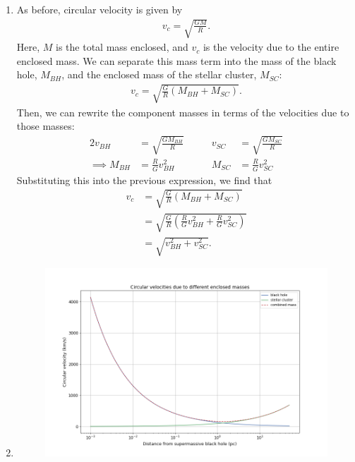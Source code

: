 \documentclass[11pt,letterpaper]{article}
\begin{document}
\begin{enumerate}[label=(\alph*)]
    \item As before, circular velocity is given by 
        \begin{align*}
            v_c = \sqrt{\frac{GM}{R}}.
        \end{align*}
        Here, $M$ is the total mass enclosed, and $v_c$ is the velocity due to the entire enclosed mass. We can separate this mass term into the mass of the black hole, $M_{BH}$, and the enclosed mass of the stellar cluster, $M_{SC}$:
        \begin{align*}
            v_c = \sqrt{\frac{G}{R}(M_{BH}+M_{SC})}.
        \end{align*}
        Then, we can rewrite the component masses in terms of the velocities due to those masses:
        \begin{alignat*}{2}
            v_{BH} &= \sqrt{\frac{GM_{BH}}{R}} &\qquad v_{SC} &= \sqrt{\frac{GM_{SC}}{R}} \\
            \implies M_{BH} &= \frac{R}{G}v_{BH}^2 &\qquad M_{SC} &= \frac{R}{G}v_{SC}^2
        \end{alignat*}
        Substituting this into the previous expression, we find that 
        \begin{align*}
            v_c &= \sqrt{\frac{G}{R}(M_{BH}+M_{SC})} \\
            &= \sqrt{\frac{G}{R}\left(\frac{R}{G}v_{BH}^2+\frac{R}{G}v_{SC}^2\right)} \\
            &= \sqrt{v_{BH}^2 + v_{SC}^2}.
        \end{align*}

    \item \hfill\vspace{-0.4cm}
        \begin{figure}[!htbp]
            \hspace{-3.cm}
            \includegraphics[width=1.4\linewidth]{velocity_curves.png}
        \end{figure}

\end{enumerate}
\end{document}
